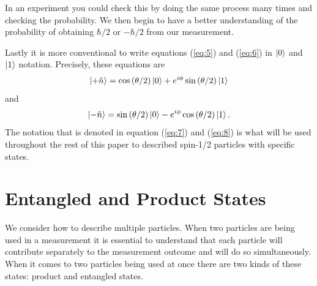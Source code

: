 \documentclass[twocolumn]{article}
\begin{document}
In an experiment you could check this by doing the same process many times and checking the probability. We then begin to have a better understanding of the probability of obtaining $\hbar/2$ or $-\hbar/2$ from our measurement.

Lastly it is more conventional to write equations (\ref{eq:5}) and (\ref{eq:6}) in $\ket{0}$ and $\ket{1}$ notation. Precisely, these equations are
\begin{equation} \label{eq:7}
\ket{+\hat{n}}=\cos{(\theta/2)}\ket{0}+e^{i\phi}\sin{(\theta/2)}\ket{1}
\end{equation}
and
\begin{equation} \label{eq:8}
\ket{-\hat{n}}=\sin{(\theta/2)}\ket{0}-e^{i\phi}\cos{(\theta/2)}\ket{1}.
\end{equation}
The notation that is denoted in equation (\ref{eq:7}) and (\ref{eq:8}) is what will be used throughout the rest of this paper to described spin-1/2 particles with specific states.
\section*{Entangled and Product States}
We consider how to describe multiple particles. When two particles are being used in a measurement it is essential to understand that each particle will contribute separately to the measurement outcome and will do so simultaneously. When it comes to two particles being used at once there are two kinds of these states: product and entangled states.
\end{document}
